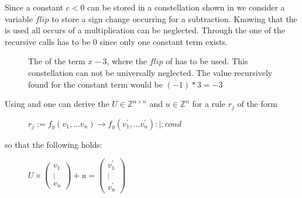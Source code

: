 Since a constant $c < 0$ can be stored in a constellation shown in  we consider a variable $flip$ to store a sign change occurring for a subtraction. Knowing that the \stdLinInt is used all occurs of a multiplication can be neglected.\newline %
Through the \stdLinInt one of the recursive calls has to be $0$ since only one constant term exists.

\begin{figure}
	\centering
	\caption{The \rpntree of the term $x-3$, where the $flip$ of  has to be used. This constellation can not be universally neglected. The value recursively found for the constant term would be $(-1)*3 = -3$}
	\label{ex:constant-term-minus}
\end{figure}

\FloatBarrier

Using  and  one can derive the \updatematrix $U \in \mathbb{Z}^{n\times n}$ and \updateconstants $u \in \mathbb{Z}^n$ for a rule $r_j$ of the form
\begin{figure}[H]
	\centering
	$r_j:= f_y(v_1,\dots v_n) \rightarrow f_y(v^\prime_1,\dots v^\prime_n) :|: cond$
\end{figure}  
so that the following holds:
\begin{figure}[H]
	\centering
	$U \times \begin{pmatrix} v_1 \\ \vdots \\ v_n \end{pmatrix} + u = \begin{pmatrix} v^\prime_1 \\ \vdots \\ v^\prime_n \end{pmatrix}$
\end{figure}

